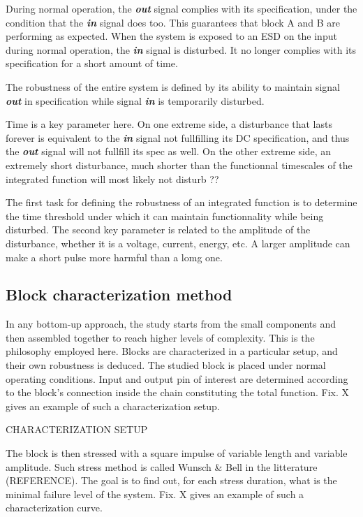 During normal operation, the \textbf{\textit{out}} signal complies with its specification,
under the condition that the \textbf{\textit{in}} signal does too.
This guarantees that block A and B are performing as expected.
When the system is exposed to an ESD on the input during normal operation, the \textbf{\textit{in}} signal is disturbed.
It no longer complies with its specification for a short amount of time.

The robustness of the entire system is defined by its ability to maintain signal \textbf{\textit{out}} in specification
while signal \textbf{\textit{in}} is temporarily disturbed.

Time is a key parameter here. On one extreme side, a disturbance that lasts forever is equivalent to the \textbf{\textit{in}} signal not fullfilling its DC specification,
and thus the \textbf{\textit{out}} signal will not fullfill its spec as well.
On the other extreme side, an extremely short disturbance, much shorter than the functionnal timescales of the integrated function will most likely not disturb ??

The first task for defining the robustness of an integrated function is to determine the time threshold under which it can maintain functionnality while being disturbed.
The second key parameter is related to the amplitude of the disturbance, whether it is a voltage, current, energy, etc.
A larger amplitude can make a short pulse more harmful than a lomg one.

\subsection{Block characterization method}
In any bottom-up approach, the study starts from the small components and then assembled together to reach higher levels of complexity.
This is the philosophy employed here.
Blocks are characterized in a particular setup, and their own robustness is deduced.
The studied block is placed under normal operating conditions.
Input and output pin of interest are determined according to the block's connection inside the chain constituting the total function.
Fix. X gives an example of such a characterization setup.

CHARACTERIZATION SETUP

The block is then stressed with a square impulse of variable length and variable amplitude.
Such stress method is called Wunsch & Bell in the litterature (REFERENCE).
The goal is to find out, for each stress duration, what is the minimal failure level of the system.
Fix. X gives an example of such a characterization curve.

